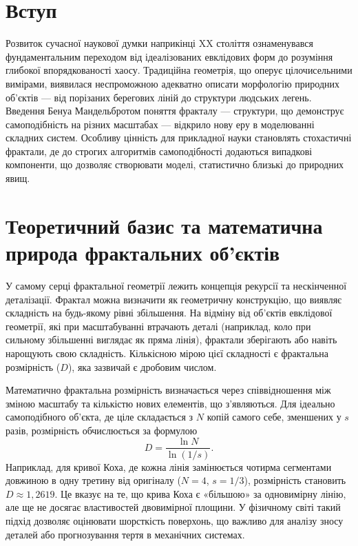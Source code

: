 \documentclass[14pt,a4paper,oneside]{extarticle}
\begin{document}
\section{Вступ}
Розвиток сучасної наукової думки наприкінці XX століття ознаменувався фундаментальним переходом від ідеалізованих евклідових форм до розуміння глибокої впорядкованості хаосу. Традиційна геометрія, що оперує цілочисельними вимірами, виявилася неспроможною адекватно описати морфологію природних об'єктів --- від порізаних берегових ліній до структури людських легень.\cite{c01}
Введення Бенуа Мандельбротом поняття фракталу --- структури, що демонструє самоподібність на різних масштабах --- відкрило нову еру в моделюванні складних систем.\cite{c02,c45}
Особливу цінність для прикладної науки становлять стохастичні фрактали, де до строгих алгоритмів самоподібності додаються випадкові компоненти, що дозволяє створювати моделі, статистично близькі до природних явищ.\cite{c04}

\section{Теоретичний базис та математична природа фрактальних об'єктів}
У самому серці фрактальної геометрії лежить концепція рекурсії та нескінченної деталізації. Фрактал можна визначити як геометричну конструкцію, що виявляє складність на будь-якому рівні збільшення.\cite{c05}
На відміну від об'єктів евклідової геометрії, які при масштабуванні втрачають деталі (наприклад, коло при сильному збільшенні виглядає як пряма лінія), фрактали зберігають або навіть нарощують свою складність.\cite{c05}
Кількісною мірою цієї складності є фрактальна розмірність ($D$), яка зазвичай є дробовим числом.\cite{c02}

Математично фрактальна розмірність визначається через співвідношення між зміною масштабу та кількістю нових елементів, що з'являються. Для ідеально самоподібного об'єкта, де ціле складається з $N$ копій самого себе, зменшених у $s$ разів, розмірність обчислюється за формулою
\begin{equation}
  D = \frac{\ln N}{\ln(1/s)}.
\end{equation}
Наприклад, для кривої Коха, де кожна лінія замінюється чотирма сегментами довжиною в одну третину від оригіналу ($N=4$, $s=1/3$), розмірність становить $D \approx 1{,}2619$.\cite{c02}
Це вказує на те, що крива Коха є «більшою» за одновимірну лінію, але ще не досягає властивостей двовимірної площини.\cite{c05}
У фізичному світі такий підхід дозволяє оцінювати шорсткість поверхонь, що важливо для аналізу зносу деталей або прогнозування тертя в механічних системах.\cite{c02}
\end{document}
